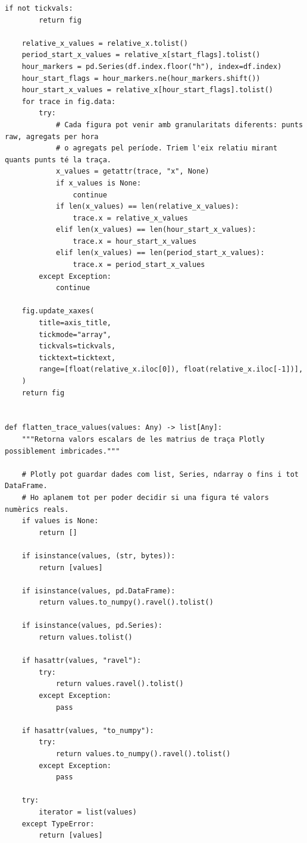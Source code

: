 \documentclass[10pt,a4paper]{article}
\begin{document}
\begin{lstlisting}[style=studioPython,caption={backend/resultats\_backend.py},label={lst:backend-resultats-backend-py}]
    if not tickvals:
        return fig

    relative_x_values = relative_x.tolist()
    period_start_x_values = relative_x[start_flags].tolist()
    hour_markers = pd.Series(df.index.floor("h"), index=df.index)
    hour_start_flags = hour_markers.ne(hour_markers.shift())
    hour_start_x_values = relative_x[hour_start_flags].tolist()
    for trace in fig.data:
        try:
            # Cada figura pot venir amb granularitats diferents: punts raw, agregats per hora
            # o agregats pel període. Triem l'eix relatiu mirant quants punts té la traça.
            x_values = getattr(trace, "x", None)
            if x_values is None:
                continue
            if len(x_values) == len(relative_x_values):
                trace.x = relative_x_values
            elif len(x_values) == len(hour_start_x_values):
                trace.x = hour_start_x_values
            elif len(x_values) == len(period_start_x_values):
                trace.x = period_start_x_values
        except Exception:
            continue

    fig.update_xaxes(
        title=axis_title,
        tickmode="array",
        tickvals=tickvals,
        ticktext=ticktext,
        range=[float(relative_x.iloc[0]), float(relative_x.iloc[-1])],
    )
    return fig


def flatten_trace_values(values: Any) -> list[Any]:
    """Retorna valors escalars de les matrius de traça Plotly possiblement imbricades."""

    # Plotly pot guardar dades com list, Series, ndarray o fins i tot DataFrame.
    # Ho aplanem tot per poder decidir si una figura té valors numèrics reals.
    if values is None:
        return []

    if isinstance(values, (str, bytes)):
        return [values]

    if isinstance(values, pd.DataFrame):
        return values.to_numpy().ravel().tolist()

    if isinstance(values, pd.Series):
        return values.tolist()

    if hasattr(values, "ravel"):
        try:
            return values.ravel().tolist()
        except Exception:
            pass

    if hasattr(values, "to_numpy"):
        try:
            return values.to_numpy().ravel().tolist()
        except Exception:
            pass

    try:
        iterator = list(values)
    except TypeError:
        return [values]


\end{lstlisting}
\end{document}
